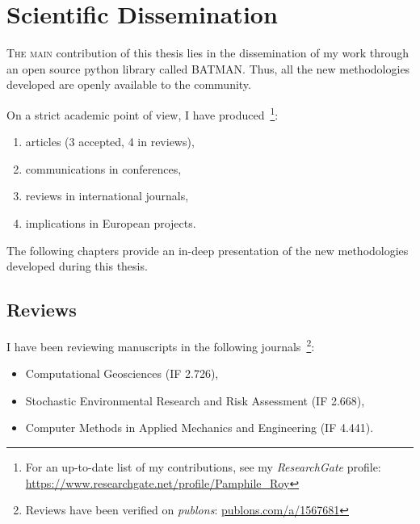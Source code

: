 \chapter{Scientific Dissemination}\label{chap:dissemination}

\lettrine{T}{he main} contribution of this thesis lies in the dissemination of my work through an open source python library called BATMAN. Thus, all the new methodologies developed are openly available to the community.

On a strict academic point of view, I have produced~\footnote{For an up-to-date list of my contributions, see my \emph{ResearchGate} profile: \href{https://www.researchgate.net/profile/Pamphile\_Roy}{https://www.researchgate.net/profile/Pamphile\_Roy}}:

\begin{enumerate}
\item[\textbf{7}] articles (3 accepted, 4 in reviews), %
\item[\textbf{6}] communications in conferences,
\item[\textbf{3}] reviews in international journals,
\item[\textbf{2}] implications in European projects.
\end{enumerate}

The following chapters provide an in-deep presentation of the new methodologies developed during this thesis.

{}

{}

\section*{Reviews}

I have been reviewing manuscripts in the following journals~\footnote{Reviews have been verified on \emph{publons}: \href{https://publons.com/a/1567681}{publons.com/a/1567681}}:

\begin{itemize}
\item Computational Geosciences (IF 2.726),
\item Stochastic Environmental Research and Risk Assessment (IF 2.668),
\item Computer Methods in Applied Mechanics and Engineering (IF  4.441).
\end{itemize}

